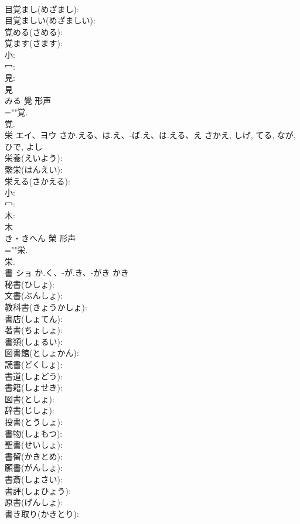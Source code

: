 \documentclass[8pt]{extreport}
\begin{document}
\begin{CJK}{UTF8}{min}
\\	目覚まし(めざまし): 
\\	目覚ましい(めざましい): 
\\	覚める(さめる): 
\\	覚ます(さます): 
\\	小: 
\\	冖: 
\\	見: 
\\	見	
\\	みる	覺	形声 
\\	=""覚.
\\	覚.
\\	栄	エイ、ヨウ	さか.える、は.え、-ば.え、は.える、え	さかえ, しげ, てる, なが, ひで, よし	
\\	栄養(えいよう): 
\\	繁栄(はんえい): 
\\	栄える(さかえる): 
\\	小: 
\\	冖: 
\\	木: 
\\	木	
\\	き・きへん	榮	形声 
\\	=""栄.
\\	栄.
\\	書	ショ	か.く、-が.き、-がき	かき	
\\	秘書(ひしょ): 
\\	文書(ぶんしょ): 
\\	教科書(きょうかしょ): 
\\	書店(しょてん): 
\\	著書(ちょしょ): 
\\	書類(しょるい): 
\\	図書館(としょかん): 
\\	読書(どくしょ): 
\\	書道(しょどう): 
\\	書籍(しょせき): 
\\	図書(としょ): 
\\	辞書(じしょ): 
\\	投書(とうしょ): 
\\	書物(しょもつ): 
\\	聖書(せいしょ): 
\\	書留(かきとめ): 
\\	願書(がんしょ): 
\\	書斎(しょさい): 
\\	書評(しょひょう): 
\\	原書(げんしょ): 
\\	書き取り(かきとり): 

\end{CJK}
\end{document}
